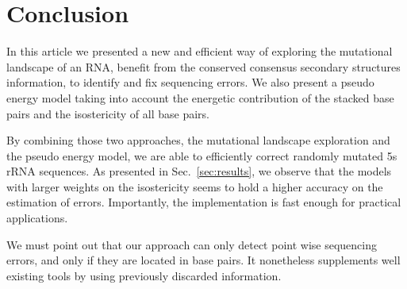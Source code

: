 \section{Conclusion}
\label{sec:conclusion}

In this article we presented a new and efficient way of
exploring the mutational landscape of an RNA, benefit from the
 conserved consensus secondary structures  information,
to identify and fix sequencing errors. We also present a
 pseudo energy model taking into account the energetic contribution 
of the stacked base pairs and the isostericity of all base pairs. 

By combining those two approaches,  the 
mutational landscape exploration and the pseudo energy model,
 we are able  to efficiently 
correct randomly mutated 5s rRNA sequences. 
As presented in Sec.~\ref{sec:results},
we observe that the models
with larger weights on the
isostericity seems to hold a higher accuracy on the estimation of errors.
Importantly, the implementation is fast enough for practical applications.

We must point out that our approach can only detect point wise 
sequencing errors, and only if they are located in base pairs. It 
nonetheless supplements well existing tools by using previously discarded
information.